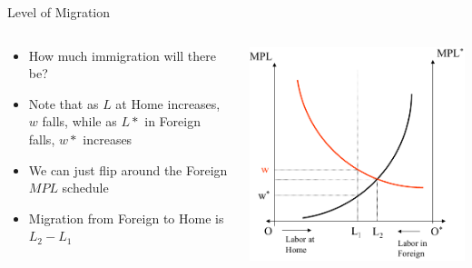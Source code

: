 \documentclass[10pt,hyperref={CJKbookmarks=true},xcolor=dvipsnames,aspectratio=169]{beamer}
\begin{document}
\begin{frame}{Level of Migration }


\begin{columns}[onlytextwidth]
\begin{column}{0.4\textwidth}
\begin{itemize}
\item How much immigration will there be? 
\item Note that as $L$ at Home increases, $w$ falls, while as $L*$ in
Foreign falls, $w*$ increases 
\item We can just flip around the Foreign $MPL$ schedule 
\item Migration from Foreign to Home is $L_{2}-L_{1}$
\end{itemize}

\end{column}
\begin{column}{0.6\textwidth}
\includegraphics[width=0.8\columnwidth]{fig/migration/lec4-29}
\end{column}
\end{columns}

\end{frame}
\end{document}
